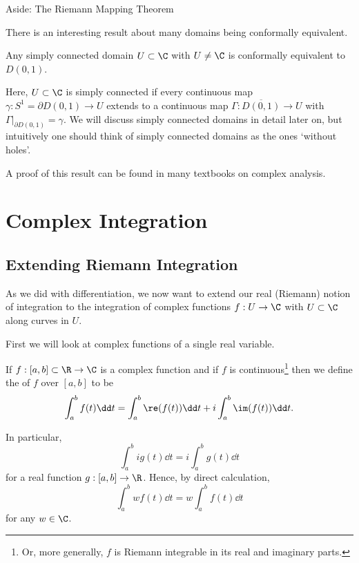 \begin{aside}{Aside: The Riemann Mapping Theorem}

    There is an interesting result about many domains being conformally equivalent.
    
    \begin{theorem}        
        Any simply connected domain $U \subset \C$ with $U \neq \C$ is conformally equivalent to $D(0, 1)$.
    \end{theorem}

    Here, $U \subset \C$ is simply connected if every continuous map $\gamma: S^1 = \partial D(0, 1) \rightarrow U$ extends to a continuous map $\Gamma: \overline{D(0, 1)} \rightarrow U$ with $\left.\Gamma\right|_{\partial D(0, 1)} = \gamma$.
    We will discuss simply connected domains in detail later on, but intuitively one should think of simply connected domains as the ones `without holes'.
    
    A proof of this result can be found in many textbooks on complex analysis.

\end{aside}

\section{Complex Integration}

\subsection{Extending Riemann Integration}

As we did with differentiation, we now want to extend our real (Riemann) notion of integration to the integration of complex functions $f: U \rightarrow \C$ with $U \subset \C$ along curves in $U$.

First we will look at complex functions of a single real variable.

\begin{definition}
    If $f: [a, b] \subset \R \rightarrow \C$ is a complex function and if $f$ is continuous\footnote{Or, more generally, $f$ is Riemann integrable in its real and imaginary parts.} then we define the  of $f$ over $[a, b]$ to be
    $$
    \int_a^b f(t) \dd t = \int_a^b \re(f(t)) \dd t + i \int_a^b \im(f(t)) \dd t.
    $$
\end{definition}

In particular,
    $$
    \int_a^b i g(t) \dd t = i \int_a^b g(t) \dd t
    $$
    for a real function $g: [a, b] \rightarrow \R$. Hence, by direct calculation,
    $$
\int_a^b w f(t) \dd t = w \int_a^b f(t) \dd t
    $$
    for any $w \in \C$.

